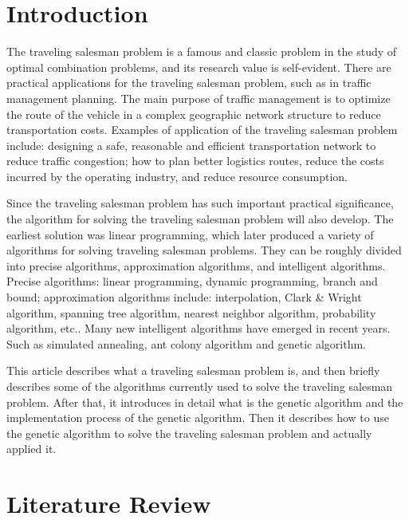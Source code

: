 \documentclass[12pt]{article}
\begin{document}
\section{Introduction}
The traveling salesman problem is a famous and classic problem in the study of optimal combination problems, and its research value is self-evident. There are practical applications for the traveling salesman problem, such as in traffic management planning. The main purpose of traffic management is to optimize the route of the vehicle in a complex geographic network structure to reduce transportation costs. Examples of application of the traveling salesman problem include: designing a safe, reasonable and efficient transportation network to reduce traffic congestion; how to plan better logistics routes, reduce the costs incurred by the operating industry, and reduce resource consumption.

Since the traveling salesman problem has such important practical significance, the algorithm for solving the traveling salesman problem will also develop. 
The earliest solution was linear programming, which later produced a variety of algorithms for solving traveling salesman problems. 
They can be roughly divided into precise algorithms, approximation algorithms, and intelligent algorithms. 
Precise algorithms: linear programming, dynamic programming, branch and bound; 
approximation algorithms include: interpolation, Clark \& Wright algorithm, spanning tree algorithm, nearest neighbor algorithm, probability algorithm, etc..
Many new intelligent algorithms have emerged in recent years. Such as simulated annealing, ant colony algorithm and genetic algorithm.

This article describes what a traveling salesman problem is, and then briefly describes some of the algorithms currently used to solve the traveling salesman problem. After that, it introduces in detail what is the genetic algorithm and the implementation process of the genetic algorithm. Then it describes how to use the genetic algorithm to solve the traveling salesman problem and actually applied it.
\section{Literature Review} 
\end{document}
